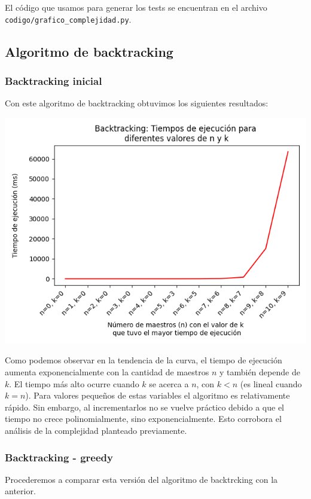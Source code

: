 \documentclass{article}
\begin{document}
El código que usamos para generar los tests se encuentran en el archivo 
\texttt{codigo/grafico\_complejidad.py}.

\subsection{Algoritmo de backtracking}
\subsubsection{Backtracking inicial}

Con este algoritmo de backtracking obtuvimos los siguientes resultados:

\includegraphics[scale=0.60]{images/graficoBacktracking.png}

Como podemos observar en la tendencia de la curva, el tiempo de ejecución aumenta exponencialmente con la cantidad de maestros $n$ y también depende de $k$. El tiempo más alto ocurre cuando $k$ se acerca a $n$, con $k < n$ (es lineal cuando $k = n$). Para valores pequeños de estas variables el algoritmo es relativamente rápido. Sin embargo, al incrementarlos no se vuelve práctico debido a que el tiempo no crece polinomialmente, sino exponencialmente.  Esto corrobora el análisis de la complejidad planteado previamente.

\subsubsection{Backtracking - greedy}
\label{sec:medidas-bt-greedy}
Procederemos a comparar esta versión del algoritmo de backtrcking con la anterior.
\end{document}
